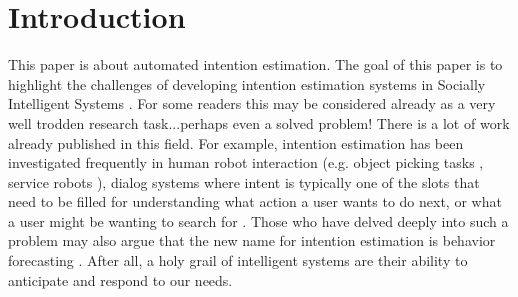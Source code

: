 \documentclass[manuscript,screen,review]{acmart}
\begin{document}

\maketitle

\section{Introduction}
This paper is about automated intention estimation. The goal of this paper is to highlight the challenges of developing intention estimation systems in Socially Intelligent Systems \cite{akata2020research,Vinciarellietalicv2009,picard2000affective}. For some readers this may be considered already as a very well trodden research task...perhaps even a solved problem! There is a lot of work already published in this field. For example, intention estimation has been investigated frequently in human robot interaction (e.g. object picking tasks \cite{Huang2015,objectpicking2021,10.1007/s11263-018-1104-4}, service robots \cite{ABBATE2024104568}), dialog systems where intent is typically one of the slots that need to be filled for understanding what action a user wants to do next, or what a user might be wanting to search for \cite{IntentMMSearch}. Those who have delved deeply into such a problem may also argue that the new name for intention estimation is behavior forecasting \cite{humantrajpredict2020,ramansocproc2021}. After all, a holy grail of intelligent systems are their ability to anticipate and respond to our needs. 
\end{document}
